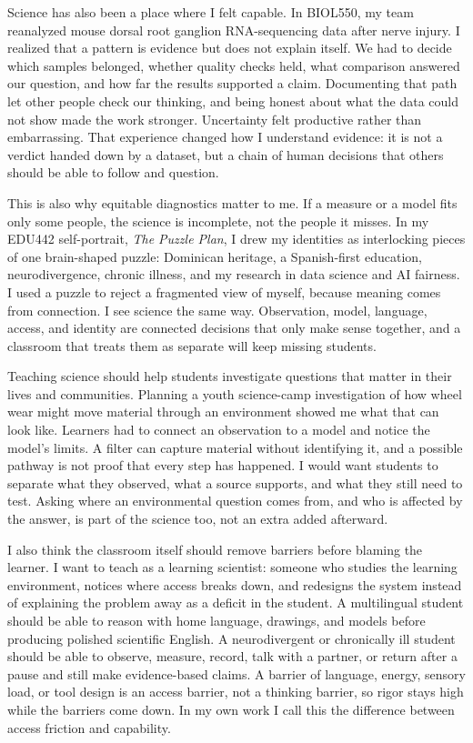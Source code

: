 \documentclass[11pt]{article}
\newcommand{\reviewsection}[1]{%
  \par\Needspace{4\baselineskip}\addvspace{0.10in}%
  \noindent{\large\bfseries\color{PrimaryRed}#1}\par
  \vspace{0.025in}%
}
\begin{document}
Science has also been a place where I felt capable. In BIOL550, my team reanalyzed mouse dorsal root ganglion RNA-sequencing data after nerve injury. I realized that a pattern is evidence but does not explain itself. We had to decide which samples belonged, whether quality checks held, what comparison answered our question, and how far the results supported a claim. Documenting that path let other people check our thinking, and being honest about what the data could not show made the work stronger. Uncertainty felt productive rather than embarrassing. That experience changed how I understand evidence: it is not a verdict handed down by a dataset, but a chain of human decisions that others should be able to follow and question.

This is also why equitable diagnostics matter to me. If a measure or a model fits only some people, the science is incomplete, not the people it misses. In my EDU442 self-portrait, \textit{The Puzzle Plan}, I drew my identities as interlocking pieces of one brain-shaped puzzle: Dominican heritage, a Spanish-first education, neurodivergence, chronic illness, and my research in data science and AI fairness. I used a puzzle to reject a fragmented view of myself, because meaning comes from connection. I see science the same way. Observation, model, language, access, and identity are connected decisions that only make sense together, and a classroom that treats them as separate will keep missing students.

\reviewsection{Teaching and Entering the Classroom}

Teaching science should help students investigate questions that matter in their lives and communities. Planning a youth science-camp investigation of how wheel wear might move material through an environment showed me what that can look like. Learners had to connect an observation to a model and notice the model's limits. A filter can capture material without identifying it, and a possible pathway is not proof that every step has happened. I would want students to separate what they observed, what a source supports, and what they still need to test. Asking where an environmental question comes from, and who is affected by the answer, is part of the science too, not an extra added afterward.

I also think the classroom itself should remove barriers before blaming the learner. I want to teach as a learning scientist: someone who studies the learning environment, notices where access breaks down, and redesigns the system instead of explaining the problem away as a deficit in the student. A multilingual student should be able to reason with home language, drawings, and models before producing polished scientific English. A neurodivergent or chronically ill student should be able to observe, measure, record, talk with a partner, or return after a pause and still make evidence-based claims. A barrier of language, energy, sensory load, or tool design is an access barrier, not a thinking barrier, so rigor stays high while the barriers come down. In my own work I call this the difference between access friction and capability.
\end{document}
